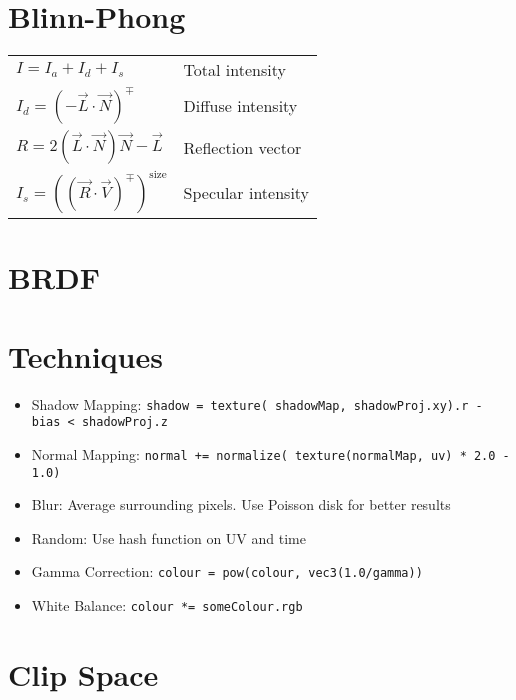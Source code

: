 \documentclass{article}
\begin{document}
\begin{landscape}
\begin{multicols}{3}
            \section{Blinn-Phong}
            \begin{tabular}{l l}
                $I = I_a + I_d + I_s$ & Total intensity \\
                $I_d = (-\vec L \cdot \vec N)^{\mp}$ & Diffuse intensity \\
                $R = 2(\vec L \cdot \vec N)\vec N - \vec L$ & Reflection vector \\
                $I_s = ((\vec R \cdot \vec V)^{\mp})^{\text{size}}$ & Specular intensity \\
            \end{tabular}

            \section{BRDF}
            \section{Techniques}
            \begin{itemize}
                \item \RaggedRight Shadow Mapping: \texttt{shadow = texture( shadowMap, shadowProj.xy).r - bias < shadowProj.z }
                \item Normal Mapping: \texttt{normal += normalize( texture(normalMap, uv) * 2.0 - 1.0)}
                \item Blur: Average surrounding pixels. Use Poisson disk for better results
                \item Random: Use hash function on UV and time
                \item Gamma Correction: \texttt{colour = pow(colour, vec3(1.0/gamma))}
                \item White Balance: \texttt{colour *= someColour.rgb}
            \end{itemize}

            \section{Clip Space}

\end{multicols}
\end{landscape}
\end{document}
